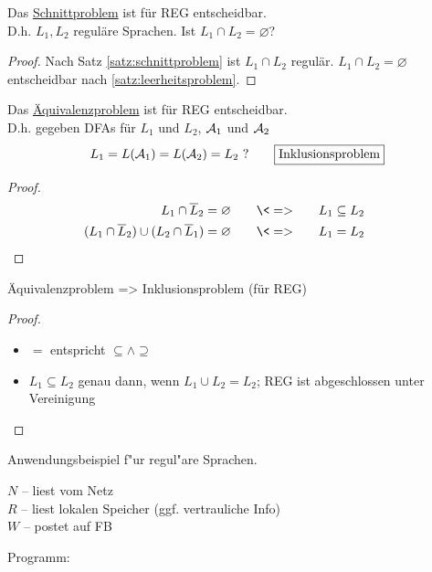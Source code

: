 \begin{Satz}[name={[Schnittproblem]}]\label{satz:schnittproblem}
	Das \underline{Schnittproblem} ist für REG entscheidbar.\\
	D.h. $L_1,L_2$ reguläre Sprachen. Ist $L_1\cap L_2 = \varnothing$?
\end{Satz}
\begin{proof}
	Nach Satz \ref{satz:schnittproblem} ist $L_1\cap L_2$ regulär. $L_1\cap L_2=\varnothing$ entscheidbar nach \autoref{satz:leerheitsproblem}.
\end{proof}

\begin{Satz}[name={[Äquivalenzproblem]}]\label{satz:äquivalenzproblem}
	Das \underline{Äquivalenzproblem} ist für REG entscheidbar.\\
	D.h. gegeben \ac{DFA}s für $L_1$ und $L_2$, $\mathcal{A}_1$ und $\mathcal{A}_2$
	\[ L_1 = L(\A_1) = L(\A_2) = L_2\ ? \qquad \framebox{Inklusionsproblem}\]
\end{Satz}
\vspace{-2em}
\begin{proof}
	\begin{alignat*}{3}
		L_1\cap \overline{L}_2 &= \varnothing &\quad&\<=>\quad & L_1 &\subseteq L_2\\
		(L_1\cap\overline{L}_2)\cup(L_2\cap \overline{L}_1) &= \varnothing &&\<=> & L_1 &= L_2 \tag*{\qedhere}
	\end{alignat*}
\end{proof}

\begin{Satz}[name={[Inklusionsproblem]}] Äquivalenzproblem \<=> Inklusionsproblem (für REG)
\end{Satz}
\begin{proof}
\begin{itemize}
\item  $=$ entspricht $\subseteq\land\supseteq$
\item $L_1 \subseteq L_2$ genau dann, wenn $L_1 \cup L_2 = L_2$; REG ist abgeschlossen unter Vereinigung
\end{itemize}
\end{proof}


Anwendungsbeispiel f"ur regul"are Sprachen.

$N$ -- liest vom Netz\\
$R$ -- liest lokalen Speicher (ggf. vertrauliche Info)\\
$W$ -- postet auf FB

Programm:


